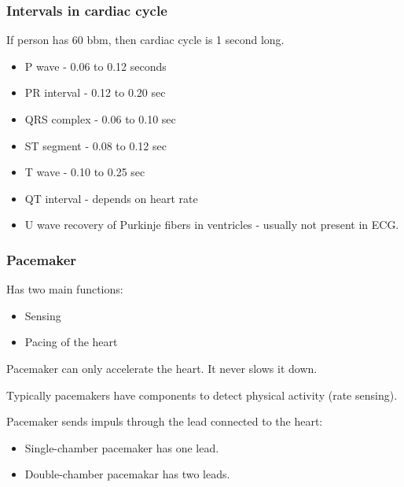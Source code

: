 \documentclass[xcolor=dvipsnames]{beamer}
\begin{document}
  \begin{frame}
    \frametitle{Intervals in cardiac cycle}
    If person has 60 bbm, then cardiac cycle is 1 second long.
    \begin{itemize}
      \item P wave - 0.06 to 0.12 seconds
      \item PR interval - 0.12 to 0.20 sec
      \item QRS complex - 0.06 to 0.10 sec
      \item ST segment - 0.08 to 0.12 sec
      \item T wave - 0.10 to 0.25 sec
      \item QT interval - depends on heart rate
      \item U wave recovery of Purkinje fibers in ventricles - usually not present in ECG.
    \end{itemize}


  \end{frame}

  \begin{frame}
    \frametitle{Pacemaker}
    Has two main functions:
    \begin{itemize}
      \item Sensing 
      \item Pacing of the heart
    \end{itemize}

    Pacemaker can only accelerate the heart. It never slows it down. 

    Typically pacemakers have components to detect physical activity (rate sensing). 

    Pacemaker sends impuls through the lead connected to the heart:
    \begin{itemize}
      \item Single-chamber pacemaker has one lead. 
      \item Double-chamber pacemakar has two leads.
    \end{itemize}
  \end{frame}
\end{document}
